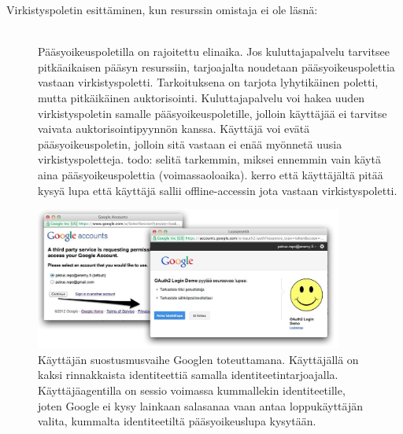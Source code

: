 \documentclass[finnish,gradu]{tktltiki}
\begin{document}
\begin{description}
    \item[Virkistyspoletin esittäminen, kun resurssin omistaja ei ole läsnä:] \hfill \\
  Pääsyoikeuspoletilla on rajoitettu elinaika. Jos kuluttajapalvelu tarvitsee pitkäaikaisen pääsyn resurssiin, tarjoajalta noudetaan pääsyoikeuspolettia vastaan virkistyspoletti. Tarkoituksena on tarjota lyhytikäinen poletti, mutta pitkäikäinen auktorisointi. Kuluttajapalvelu voi hakea uuden virkistyspoletin samalle pääsyoikeuspoletille, jolloin käyttäjää ei tarvitse vaivata auktorisointipyynnön kanssa. Käyttäjä voi evätä pääsyoikeuspoletin, jolloin sitä vastaan ei enää myönnetä uusia virkistyspoletteja.    todo: selitä tarkemmin, miksei ennemmin vain käytä aina pääsyoikeuspolettia (voimassaoloaika). kerro että käyttäjältä pitää kysyä lupa että käyttäjä sallii offline-accessin jota vastaan virkistyspoletti. %
    \end{description}


  \begin{figure}
    \centering
    \includegraphics[width=0.9\textwidth]{images/google_id_and_user_consent.jpg}
    \caption{Käyttäjän suostusmusvaihe Googlen toteuttamana. Käyttäjällä on kaksi rinnakkaista identiteettiä samalla identiteetintarjoajalla. Käyttäjäagentilla on sessio voimassa kummallekin identiteetille, joten Google ei kysy lainkaan salasanaa vaan antaa loppukäyttäjän valita, kummalta identiteetiltä pääsyoikeuslupa kysytään.}
    \label{fig:google_id_and_user_consent}
  \end{figure}







\end{document}
